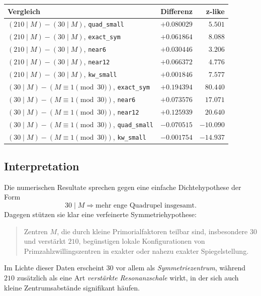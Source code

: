 \documentclass[11pt,a4paper]{article}
\theoremstyle{definition}
\theoremstyle{plain}
\theoremstyle{remark}
\begin{document}
	\begin{center}
		\begin{tabular}{lrr}
			\hline
			Vergleich & Differenz & z-like \\
			\hline
			$(210\mid M)-(30\mid M)$, \texttt{quad\_small} & $+0.080029$ & $5.501$ \\
			$(210\mid M)-(30\mid M)$, \texttt{exact\_sym}  & $+0.061864$ & $8.088$ \\
			$(210\mid M)-(30\mid M)$, \texttt{near6}      & $+0.030446$ & $3.206$ \\
			$(210\mid M)-(30\mid M)$, \texttt{near12}     & $+0.066372$ & $4.776$ \\
			$(210\mid M)-(30\mid M)$, \texttt{kw\_small}  & $+0.001846$ & $7.577$ \\
			\hline
			$(30\mid M)- (M\equiv 1 \!\!\!\!\pmod{30})$, \texttt{exact\_sym} & $+0.194394$ & $80.440$ \\
			$(30\mid M)- (M\equiv 1 \!\!\!\!\pmod{30})$, \texttt{near6}      & $+0.073576$ & $17.071$ \\
			$(30\mid M)- (M\equiv 1 \!\!\!\!\pmod{30})$, \texttt{near12}     & $+0.125939$ & $20.640$ \\
			$(30\mid M)- (M\equiv 1 \!\!\!\!\pmod{30})$, \texttt{quad\_small}& $-0.070515$ & $-10.090$ \\
			$(30\mid M)- (M\equiv 1 \!\!\!\!\pmod{30})$, \texttt{kw\_small}  & $-0.001754$ & $-14.937$ \\
			\hline
		\end{tabular}
	\end{center}
	
	\subsection{Interpretation}
	
	Die numerischen Resultate sprechen gegen eine einfache Dichtehypothese der Form
	\[
	30\mid M \Longrightarrow \text{mehr enge Quadrupel insgesamt}.
	\]
	Dagegen stützen sie klar eine verfeinerte Symmetriehypothese:
	
	\begin{quote}
		Zentren $M$, die durch kleine Primorialfaktoren teilbar sind, insbesondere $30$ und verstärkt $210$, begünstigen lokale Konfigurationen von Primzahlzwillingszentren in exakter oder nahezu exakter Spiegelstellung.
	\end{quote}
	
	Im Lichte dieser Daten erscheint $30$ vor allem als \emph{Symmetriezentrum}, während $210$ zusätzlich als eine Art \emph{verstärkte Resonanzschale} wirkt, in der sich auch kleine Zentrumsabstände signifikant häufen.
	
\end{document}
